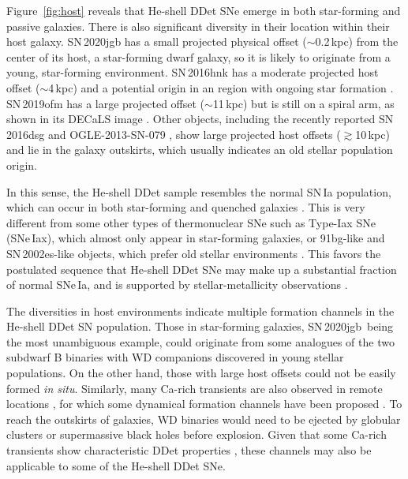 \documentclass[twocolumn]{aastex631}
\newcommand{\sn}{SN\,2020jgb}
\begin{document}
Figure~\ref{fig:host} reveals that He-shell DDet SNe emerge in both star-forming and passive galaxies. There is also significant diversity in their location within their host galaxy. SN\,2020jgb has a small projected physical offset ($\sim$0.2\,kpc) from the center of its host, a star-forming dwarf galaxy, so it is likely to originate from a young, star-forming environment. SN\,2016hnk has a moderate projected host offset ($\sim$4\,kpc) and a potential origin in an  region with ongoing star formation \citep{galbany_16hnk_2019}. SN\,2019ofm has a large projected offset ($\sim$11\,kpc) but is still on a spiral arm, as shown in its DECaLS image \citep{Dey_2019}. Other objects, including the recently reported SN\,2016dsg and OGLE-2013-SN-079 \citep{Dong_16dsg_2022}, show large projected host offsets ($\gtrsim$10\,kpc) and lie in the galaxy outskirts, which usually indicates an old stellar population origin.

In this sense, the He-shell DDet sample resembles the normal SN\,Ia population, which can occur in both star-forming and quenched galaxies \citep[e.g.,][]{Sullivan_2006, Smith_2012}. This is very different from some other types of thermonuclear SNe such as Type-Iax SNe (SNe\,Iax), which almost only appear in star-forming galaxies, or 91bg-like and SN\,2002es-like \citep[02es-like;][]{Ganeshalingam_2012} objects, which prefer old stellar environments \citep[see the review by][]{Jha_2019}. This favors the postulated sequence that He-shell DDet SNe may make up a substantial fraction of normal SNe\,Ia, and is supported by stellar-metallicity observations \citep{Sanders_2021, Eitner_2022}.

The diversities in host environments indicate multiple formation channels in the He-shell DDet SN population. Those in star-forming galaxies, \sn\ being the most unambiguous example, could originate from some analogues of the two subdwarf B binaries with WD companions \citep{Geier_2013, Kupfer_2022} discovered in young stellar populations.
On the other hand, those with large host offsets could not be easily formed {\it in situ}. Similarly, many Ca-rich transients are also observed in remote locations \citep[e.g.,][]{Lunnan_2017}, for which some dynamical formation channels have been proposed \citep{Lyman_2014}. To reach the outskirts of galaxies, WD binaries would need to be ejected by globular clusters \citep{Shen_2019} or supermassive black holes \citep{Foley_2015} before explosion. Given that some Ca-rich transients show characteristic DDet properties \citep{de_Ca_rich_2020}, these channels may also be applicable to some of the He-shell DDet SNe. 
\end{document}
